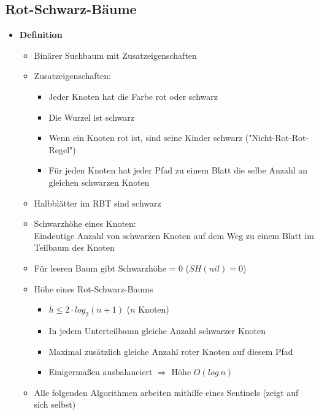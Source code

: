 \subsection{Rot-Schwarz-Bäume}
    \begin{itemize}
        \item \textbf{Definition}
            \begin{itemize}
                \item Binärer Suchbaum mit Zusatzeigenschaften
                \item Zusatzeigenschaften:
                    \begin{itemize}
                        \item Jeder Knoten hat die Farbe rot oder schwarz
                        \item Die Wurzel ist schwarz
                        \item Wenn ein Knoten rot ist, sind seine Kinder schwarz (\string"Nicht-Rot-Rot-Regel\string")
                        \item Für jeden Knoten hat jeder Pfad zu einem Blatt die selbe Anzahl an gleichen schwarzen Knoten
                    \end{itemize}
                \item Halbblätter im RBT sind schwarz
                \item Schwarzhöhe eines Knoten: \\
                        Eindeutige Anzahl von schwarzen Knoten auf dem Weg zu einem Blatt im Teilbaum des Knoten
                \item Für leeren Baum gibt Schwarzhöhe = 0 ($SH(nil)=0$)
                \item Höhe eines Rot-Schwarz-Baums
                    \begin{itemize}
                        \item $h \leq 2 \cdot log_2(n+1)$  ($n$ Knoten)
                        \item In jedem Unterteilbaum gleiche Anzahl schwarzer Knoten
                        \item Maximal zusätzlich gleiche Anzahl roter Knoten auf diesem Pfad
                        \item Einigermaßen ausbalanciert $\Rightarrow$ Höhe $O(log~n)$
                    \end{itemize}
                \item Alle folgenden Algorithmen arbeiten mithilfe eines Sentinels (zeigt auf sich selbst)
            \end{itemize}
        

\end{itemize}

